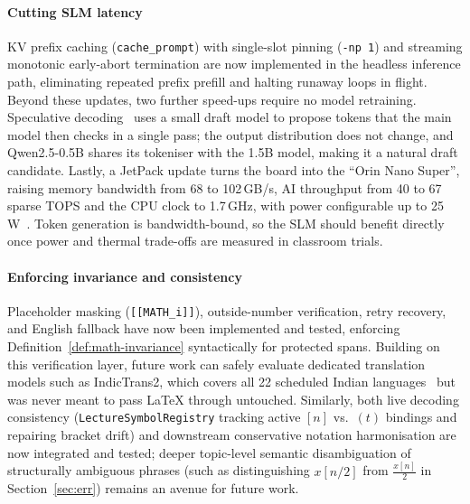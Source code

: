 \documentclass[11pt,a4paper,oneside]{report}
\theoremstyle{definition}
\newcommand{\code}[1]{\texttt{\small #1}}
\begin{document}
\paragraph{Cutting SLM latency} KV prefix caching (\code{cache\_prompt}) with single-slot pinning (\code{-np 1}) and streaming monotonic early-abort termination are now implemented in the headless inference path, eliminating repeated prefix prefill and halting runaway loops in flight. Beyond these updates, two further speed-ups require no model retraining. Speculative decoding~\cite{leviathan2023speculative} uses a small draft model to propose tokens that the main model then checks in a single pass; the output distribution does not change, and Qwen2.5-0.5B shares its tokeniser with the 1.5B model, making it a natural draft candidate. Lastly, a JetPack update turns the board into the ``Orin Nano Super'', raising memory bandwidth from 68 to 102\,GB/s, AI throughput from 40 to 67 sparse TOPS and the CPU clock to 1.7\,GHz, with power configurable up to 25\,W~\cite{nvidia2024super}. Token generation is bandwidth-bound, so the SLM should benefit directly once power and thermal trade-offs are measured in classroom trials.

\paragraph{Enforcing invariance and consistency} Placeholder masking (\code{[[MATH\_i]]}), outside-number verification, retry recovery, and English fallback have now been implemented and tested, enforcing Definition~\ref{def:math-invariance} syntactically for protected spans. Building on this verification layer, future work can safely evaluate dedicated translation models such as IndicTrans2, which covers all 22 scheduled Indian languages~\cite{gala2023indictrans2} but was never meant to pass LaTeX through untouched. Similarly, both live decoding consistency (\code{LectureSymbolRegistry} tracking active $[n]$ vs.\ $(t)$ bindings and repairing bracket drift) and downstream conservative notation harmonisation are now integrated and tested; deeper topic-level semantic disambiguation of structurally ambiguous phrases (such as distinguishing $x[n/2]$ from $\frac{x[n]}{2}$ in Section~\ref{sec:err}) remains an avenue for future work.
\end{document}
